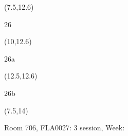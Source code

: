 \documentclass[a4paper]{article}
\newcommand{\myseat}[4]{%
\vspace{-0.1cm}
\parbox[t][2.2cm][t]{3.5cm}{
\small #1 %
\begin{description}
\vspace{-0.1cm}
\item [ID:] #2
\vspace{-0.1cm}
\item [Team:] #3 \normalsize
\vspace{-0.1cm}
\item \normalsize #4
\vspace{-0.1cm}
\end{description}
}
}
\begin{document}
\begin{CJK}{UTF8}{cyberbit}
\begin{textblock}{2.5}(7.5,12.6)
\textblockcolor{}
\myseat{26}{}{}{}
\end{textblock}

\begin{textblock}{2.5}(10,12.6)
\textblockcolor{}
\myseat{26a}{}{}{}
\end{textblock}

\begin{textblock}{2.5}(12.5,12.6)
\textblockcolor{}
\myseat{26b}{}{}{}
\end{textblock}

\begin{textblock}{7.5}(7.5,14)
\textblockcolor{}
\parbox[t][2.2cm][t]{9.5cm}{%
\large Room 706, FLA0027: 3 session, Week: 
}
\end{textblock}

\end{CJK}
\end{document}
